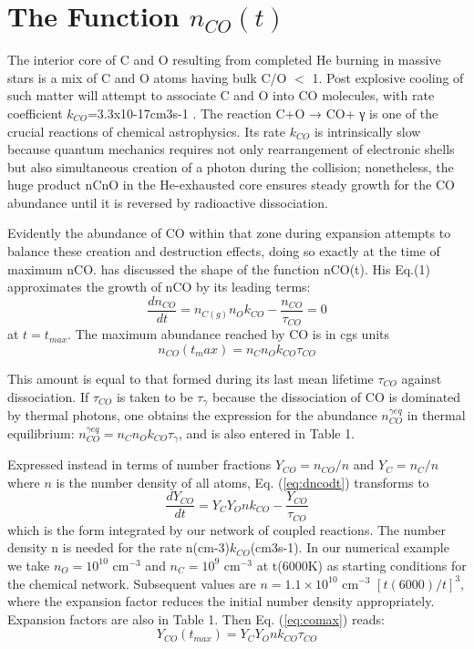 \documentclass[manuscript]{aastex}
\begin{document}
\section{The Function $n_{CO}(t)$}

The interior core of C and O resulting from completed He burning in massive
stars is a mix of C and O atoms having bulk C/O $<$ 1. Post explosive cooling of
such matter will attempt to associate C and O into CO molecules, with rate
coefficient $k_{CO}$=3.3x10-17cm3s-1 \citep{1990ApJ...358..262L}.
The reaction C+O → CO+ γ is one of the crucial reactions of chemical
astrophysics. Its rate $k_{CO}$ is intrinsically slow because quantum mechanics
requires not only rearrangement of electronic shells but also simultaneous
creation of a photon during the collision; nonetheless, the huge product
nCnO in the He-exhausted core ensures steady growth for the CO abundance
until it is reversed by radioactive dissociation. 

Evidently the abundance of CO within that zone during expansion attempts to
balance these creation and destruction effects, doing so exactly at the
time of maximum nCO. \citet{2013ApJ...762....5C}
has discussed the shape of the function
nCO(t). His Eq.(1) approximates the growth of nCO by its leading terms:
\begin{equation}
\frac{dn_{CO}}{dt} = n_{C(g)} n_O k_{CO} - \frac{n_{CO}}{\tau_{CO}} = 0
\label{eq:dncodt}
\end{equation}
at $t = t_{max}$.
The maximum abundance reached by CO is in cgs units
\begin{equation}
n_{CO}(t_max) = n_C n_O k_{CO} \tau_{CO} 
\label{eq:comax}
\end{equation}

This amount is equal to that formed during its last mean lifetime $\tau_{CO}$
against dissociation. If $\tau_{CO}$ is taken to be $\tau_\gamma$ because
the dissociation of CO is dominated by thermal photons,
one obtains the expression for the abundance $n_{CO}^{\gamma eq}$ in thermal
equilibrium: $n_{CO}^{\gamma eq} = n_C n_O k_{CO} \tau_\gamma$,
and is also entered in Table 1. 

Expressed instead in terms of number fractions $Y_{CO} = n_{CO} / n$
and $Y_C = n_C / n$ where $n$ is the number density of all atoms,
Eq. (\ref{eq:dncodt}) transforms to 
\begin{equation}
\frac{dY_{CO}}{dt} = Y_C Y_O n k_{CO} - \frac{Y_{CO}}{\tau_{CO}}	
\label{eq:dycodt}
\end{equation}
which is the form integrated by our network of coupled reactions.
The number density n is needed for the rate n(cm-3)$k_{CO}$(cm3s-1).
In our numerical example we take $n_O = 10^{10}$ cm$^{-3}$ and
$n_C = 10^9$ cm$^{-3}$ at t(6000K) as starting conditions for the
chemical network. Subsequent values are $n = 1.1 \times 10^{10}$ cm$^{-3}$
$[t(6000)/t]^3$, where the expansion factor reduces the initial number
density appropriately. Expansion factors are also in Table 1. Then
Eq. (\ref{eq:comax}) reads:
\begin{equation}
Y_{CO}(t_{max}) = Y_C Y_O n k_{CO} \tau_{CO}
\label{eq:ycomax}
\end{equation}
\end{document}
